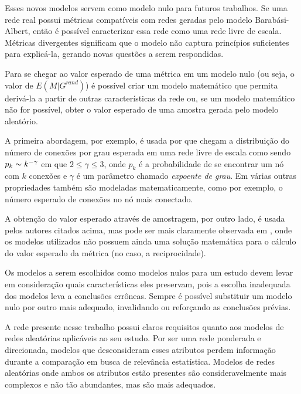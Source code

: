 \documentclass[12pt,a4paper]{article}
\theoremstyle{hypo}
\begin{document}
Esses novos modelos servem como modelo nulo para futuros trabalhos. Se uma rede real possui métricas compatíveis com redes geradas pelo modelo Barabási-Albert, então é possível caracterizar essa rede como uma rede livre de escala. Métricas divergentes significam que o modelo não captura princípios suficientes para explicá-la, gerando novas questões a serem respondidas.

Para se chegar ao valor esperado de uma métrica em um modelo nulo (ou seja, o valor de $E(M|G^\textit{rand})$) é possível criar um modelo matemático que permita derivá-la a partir de outras características da rede ou, se um modelo matemático não for possível, obter o valor esperado de uma amostra gerada pelo modelo aleatório.

A primeira abordagem, por exemplo, é usada por  que chegam a distribuição do número de conexões por grau esperada em uma rede livre de escala como sendo $p_k \thicksim k^{-\gamma}$ em que $2 \leq \gamma \leq 3$, onde $p_k$ é a probabilidade de se encontrar um nó com $k$ conexões e $\gamma$ é um parâmetro chamado \textit{expoente de grau}. Em  várias outras propriedades também são modeladas matematicamente, como por exemplo, o número esperado de conexões no nó mais conectado.

A obtenção do valor esperado através de amostragem, por outro lado, é usada pelos autores citados acima, mas pode ser mais claramente observada em , onde os modelos utilizados não possuem ainda uma solução matemática para o cálculo do valor esperado da métrica (no caso, a reciprocidade).

Os modelos a serem escolhidos como modelos nulos para um estudo devem levar em consideração quais características eles preservam, pois a escolha inadequada dos modelos leva a conclusões errôneas. Sempre é possível substituir um modelo nulo por outro mais adequado, invalidando ou reforçando as conclusões prévias.

A rede presente nesse trabalho possui claros requisitos quanto aos modelos de redes aleatórias aplicáveis ao seu estudo. Por ser uma rede ponderada e direcionada, modelos que desconsideram esses atributos perdem informação durante a comparação em busca de relevância estatística. Modelos de redes aleatórias onde ambos os atributos estão presentes são consideravelmente mais complexos e não tão abundantes, mas são mais adequados.
\end{document}
